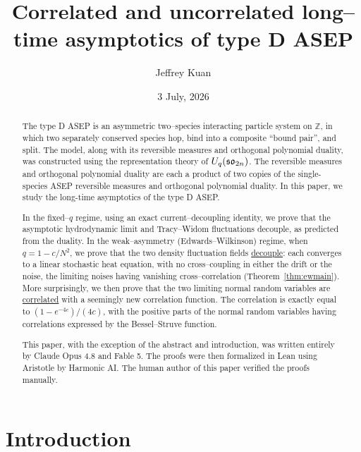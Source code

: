 \documentclass[11pt]{article}
\title{\bf Correlated and uncorrelated long--time asymptotics of type D ASEP}
\author{Jeffrey Kuan}
\date{3 July, 2026}
\theoremstyle{plain}
\theoremstyle{definition}
\theoremstyle{remark}
\newcommand{\Z}{\mathbb{Z}}\newcommand{\R}{\mathbb{R}}\newcommand{\N}{\mathbb{N}}
\begin{document}
\maketitle

\begin{abstract}
The type D ASEP is an asymmetric  two--species interacting particle system on $\Z$, in which two separately conserved species hop, bind into a composite ``bound pair'', and split. The model, along with its reversible measures and orthogonal polynomial duality, was constructed using the representation theory of $U_q(\mathfrak{so}_{2n})$. The reversible measures and orthogonal polynomial duality are each a product of two copies of the single-species ASEP reversible measures and orthogonal polynomial duality. In this paper, we study the long-time asymptotics of the type D ASEP. 

In the fixed--$q$ regime, using an exact current--decoupling identity, we prove that the asymptotic hydrodynamic limit and Tracy--Widom fluctuations decouple, as predicted from the duality. In the weak--asymmetry (Edwards--Wilkinson) regime, when $q=1-c/N^2$, we prove
that the two density fluctuation fields \underline{decouple}: each converges to a linear
stochastic heat equation, with no cross--coupling in either the drift or the noise,
the limiting noises having vanishing cross--correlation (Theorem~\ref{thm:ewmain}).
More surprisingly, we then prove that the two limiting normal random variables are \underline{correlated} with a seemingly new correlation function. The correlation is exactly equal to $(1-e^{-4c})/(4c)$, with the positive parts of the normal random variables having correlations expressed by the Bessel--Struve function. 

This paper, with the exception of the abstract and introduction, was written entirely by Claude Opus 4.8 and Fable 5. The proofs were then formalized in Lean using Aristotle by Harmonic AI. The human author of this paper verified the proofs manually.

\end{abstract}

{\small\tableofcontents}

\section{Introduction}\label{sec:intro}
\end{document}
